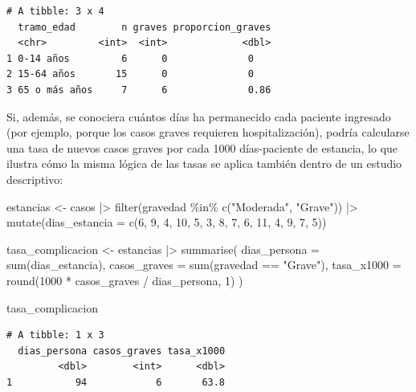 \documentclass[
  spanish,
  a4paper,
]{scrreport}
\newenvironment{Shaded}{\begin{snugshade}}{\end{snugshade}}
\newcommand{\AttributeTok}[1]{\textcolor[rgb]{0.40,0.45,0.13}{#1}}
\newcommand{\DecValTok}[1]{\textcolor[rgb]{0.68,0.00,0.00}{#1}}
\newcommand{\FunctionTok}[1]{\textcolor[rgb]{0.28,0.35,0.67}{#1}}
\newcommand{\NormalTok}[1]{\textcolor[rgb]{0.00,0.23,0.31}{#1}}
\newcommand{\OtherTok}[1]{\textcolor[rgb]{0.00,0.23,0.31}{#1}}
\newcommand{\SpecialCharTok}[1]{\textcolor[rgb]{0.37,0.37,0.37}{#1}}
\newcommand{\StringTok}[1]{\textcolor[rgb]{0.13,0.47,0.30}{#1}}
\theoremstyle{definition}
\theoremstyle{definition}
\theoremstyle{remark}
\begin{document}
\begin{verbatim}
# A tibble: 3 x 4
  tramo_edad        n graves proporcion_graves
  <chr>         <int>  <int>             <dbl>
1 0-14 años         6      0              0   
2 15-64 años       15      0              0   
3 65 o más años     7      6              0.86
\end{verbatim}

Si, además, se conociera cuántos días ha permanecido cada paciente
ingresado (por ejemplo, porque los casos graves requieren
hospitalización), podría calcularse una tasa de nuevos casos graves por
cada 1000 días-paciente de estancia, lo que ilustra cómo la misma lógica
de las tasas se aplica también dentro de un estudio descriptivo:

\begin{Shaded}
\begin{Highlighting}[]
\NormalTok{estancias }\OtherTok{\textless{}{-}}\NormalTok{ casos }\SpecialCharTok{|\textgreater{}}
  \FunctionTok{filter}\NormalTok{(gravedad }\SpecialCharTok{\%in\%} \FunctionTok{c}\NormalTok{(}\StringTok{"Moderada"}\NormalTok{, }\StringTok{"Grave"}\NormalTok{)) }\SpecialCharTok{|\textgreater{}}
  \FunctionTok{mutate}\NormalTok{(}\AttributeTok{dias\_estancia =} \FunctionTok{c}\NormalTok{(}\DecValTok{6}\NormalTok{, }\DecValTok{9}\NormalTok{, }\DecValTok{4}\NormalTok{, }\DecValTok{10}\NormalTok{, }\DecValTok{5}\NormalTok{, }\DecValTok{3}\NormalTok{, }\DecValTok{8}\NormalTok{, }\DecValTok{7}\NormalTok{, }\DecValTok{6}\NormalTok{, }\DecValTok{11}\NormalTok{, }\DecValTok{4}\NormalTok{, }\DecValTok{9}\NormalTok{, }\DecValTok{7}\NormalTok{, }\DecValTok{5}\NormalTok{))}

\NormalTok{tasa\_complicacion }\OtherTok{\textless{}{-}}\NormalTok{ estancias }\SpecialCharTok{|\textgreater{}}
  \FunctionTok{summarise}\NormalTok{(}
    \AttributeTok{dias\_persona =} \FunctionTok{sum}\NormalTok{(dias\_estancia),}
    \AttributeTok{casos\_graves =} \FunctionTok{sum}\NormalTok{(gravedad }\SpecialCharTok{==} \StringTok{"Grave"}\NormalTok{),}
    \AttributeTok{tasa\_x1000 =} \FunctionTok{round}\NormalTok{(}\DecValTok{1000} \SpecialCharTok{*}\NormalTok{ casos\_graves }\SpecialCharTok{/}\NormalTok{ dias\_persona, }\DecValTok{1}\NormalTok{)}
\NormalTok{  )}

\NormalTok{tasa\_complicacion}
\end{Highlighting}
\end{Shaded}

\begin{verbatim}
# A tibble: 1 x 3
  dias_persona casos_graves tasa_x1000
         <dbl>        <int>      <dbl>
1           94            6       63.8
\end{verbatim}
\end{document}
